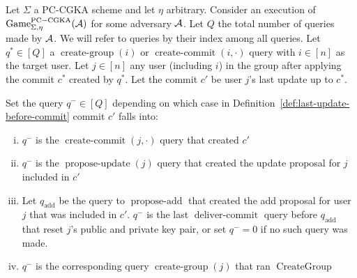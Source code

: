 \begin{definition} \label{def:safe-commit-wrt-user}
	Let $\Sigma$ a PC-CGKA scheme and let $\eta$ arbitrary. Consider an execution of $\mathrm{Game}_{\Sigma, \eta}^{\mathrm{PC-CGKA}}(\mathcal{A})$ for some adversary $\mathcal{A}$. Let $Q$ the total number of queries made by $\mathcal{A}$. We will refer to queries by their index among all queries. Let $q^* \in [Q]$ a $\operatorname{create-group}(i)$ or $\operatorname{create-commit}(i, \cdot)$ query with $i \in [n]$ as the target user. Let $j \in [n]$ any user (including $i$) in the group after applying the commit $c^*$ created by $q^*$. Let the commit $c'$ be user $j$'s last update up to $c^*$.

	Set the query $q^- \in [Q]$ depending on which case in Definition~\ref{def:last-update-before-commit} commit $c'$ falls into:
	\begin{enumerate}[(i)]
		\item $q^-$ is the $\operatorname{create-commit}(j, \cdot)$ query that created $c'$
		\item $q^-$ is the $\operatorname{propose-update}(j)$ query that created the update proposal for $j$ included in $c'$
		\item Let $q_{\mathrm{add}}$ be the query to $\operatorname{propose-add}$ that created the add proposal for user $j$ that was included in $c'$.
		      $q^-$ is the last $\operatorname{deliver-commit}$ query before $q_{\mathrm{add}}$ that reset $j$'s public and private key pair, or set $q^- = 0$ if no such query was made.
		\item $q^-$ is the corresponding query $\operatorname{create-group}(j)$ that ran $\operatorname{CreateGroup}$
	\end{enumerate}


\end{definition}
